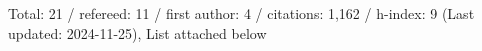 Total: 21 / refereed: 11 / first author: 4 / citations: 1,162 / h-index: 9 (Last updated: 2024-11-25), List attached below